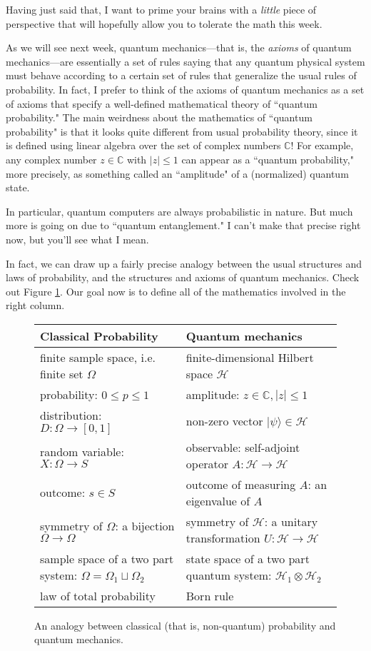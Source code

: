 \documentclass{article}
\begin{document}
Having just said that, I want to prime your brains with a \emph{little} piece of perspective that will hopefully allow you to tolerate the math this week.

As we will see next week, quantum mechanics---that is, the \emph{axioms} of quantum mechanics---are essentially a set of rules saying that any quantum physical system must behave according to a certain set of rules that generalize the usual rules of probability.  In fact, I prefer to think of the axioms of quantum mechanics as a set of axioms that specify a well-defined mathematical theory of ``quantum probability."  The main weirdness about the mathematics of ``quantum probability" is that it looks quite different from usual probability theory, since it is defined using linear algebra over the set of complex numbers $\mathbb{C}$!  For example, any complex number $z \in \mathbb{C}$ with $|z| \le 1$ can appear as a ``quantum probability," more precisely, as something called an ``amplitude" of a (normalized) quantum state.

In particular, quantum computers are always probabilistic in nature.  But much more is going on due to ``quantum entanglement."  I can't make that precise right now,  but you'll see what I mean.

In fact, we can draw up a fairly precise analogy between the usual structures and laws of probability, and the structures and axioms of quantum mechanics.  Check out Figure \ref{f:analogy}.  Our goal now is to define all of the mathematics involved in the right column.

\begin{figure}
\begin{tabular*}{\linewidth}{l|l}
    {\bf Classical Probability} & {\bf Quantum mechanics} \\
    \hline
    finite sample space, i.e. finite set $\Omega$ & finite-dimensional Hilbert space $\mathcal{H}$\\
    probability: $0 \leq p \leq 1$ & amplitude: $z\in\mathbb{C}, |z| \leq 1$\\
    distribution: $D:\Omega\to[0, 1]$ & non-zero vector $|\psi\rangle \in \mathcal{H}$\\
    random variable: $X : \Omega\to S$ & observable: self-adjoint operator $A:\mathcal{H}\to\mathcal{H}$ \\
    outcome: $s\in S$ & outcome of measuring $A$: an eigenvalue of $A$\\
    symmetry of $\Omega$: a bijection $\Omega\to\Omega$ & symmetry of $\mathcal{H}$: a unitary transformation $U:\mathcal{H}\to\mathcal{H}$\\
sample space of a two part system: $\Omega = \Omega_1\sqcup\Omega_2$ & state space of a two part quantum system: $\mathcal{H}_1\otimes\mathcal{H}_2$ \\
    law of total probability & Born rule
\end{tabular*}
\caption{An analogy between classical (that is, non-quantum) probability and quantum mechanics.}
\label{f:analogy}
\end{figure}
\end{document}
